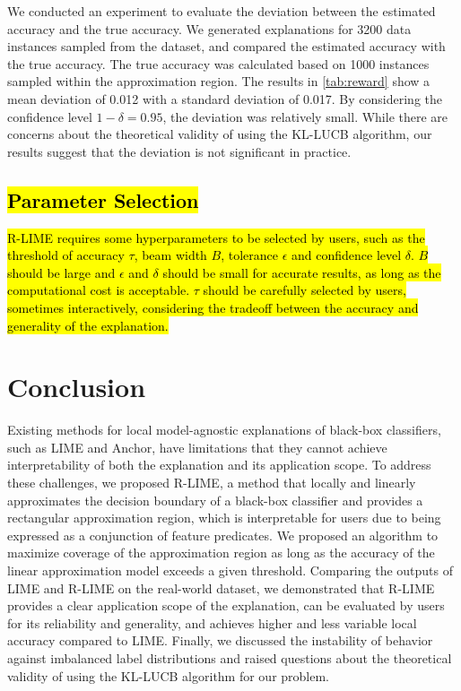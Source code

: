 \documentclass[runningheads]{llncs}
\begin{document}
{We conducted an experiment to evaluate the deviation
between the estimated accuracy and the true accuracy.
We generated explanations for 3200 data instances sampled from the dataset,
and compared the estimated accuracy with the true accuracy.
The true accuracy was calculated based on 1000 instances sampled
within the approximation region.
The results in \cref{tab:reward} show a mean deviation of 0.012
with a standard deviation of 0.017.
By considering the confidence level $1-\delta=0.95$,
the deviation was relatively small.
While there are concerns about the theoretical validity of using the KL-LUCB algorithm,
our results suggest that the deviation is not significant in practice.

\subsection{\hl{Parameter Selection}}\label{sec:param}

\hl{
  R-LIME requires some hyperparameters to be selected by users,
  such as the threshold of accuracy $\tau$, beam width $B$, tolerance $\epsilon$
  and confidence level $\delta$.
  $B$ should be large and $\epsilon$ and $\delta$ should be small for
  accurate results, as long as the computational cost is acceptable.
  $\tau$ should be carefully selected by users, sometimes interactively,
  considering the tradeoff between
  the accuracy and generality of the explanation.
}

\section{Conclusion}
Existing methods for
local model-agnostic explanations of black-box classifiers,
such as LIME and Anchor,
have limitations that they cannot achieve interpretability of
both the explanation and its application scope.
To address these challenges,
we proposed R-LIME,
a method that locally and linearly approximates the decision boundary
of a black-box classifier and provides a rectangular approximation region,
which is interpretable for users due to being expressed as a conjunction of feature predicates.
We proposed an algorithm to
maximize coverage of the approximation region
as long as the accuracy of the linear approximation model exceeds a given threshold.
Comparing the outputs of LIME and R-LIME on the real-world dataset,
we demonstrated that R-LIME provides a clear application scope of the
explanation, can be evaluated by users for its reliability and generality,
and achieves higher and less variable local accuracy compared to LIME\@.
Finally, we discussed the instability of behavior against imbalanced label
distributions and raised questions about the theoretical validity of using
the KL-LUCB algorithm for our problem.

\newpage


}

\newpage
\setcounter{page}{1}
\paper{}
\renewcommand{\hl}[1]{#1}
\end{document}
